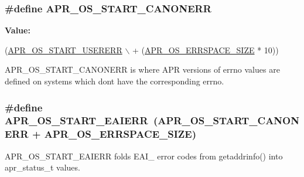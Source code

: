 \subsubsection[{\texorpdfstring{A\+P\+R\+\_\+\+O\+S\+\_\+\+S\+T\+A\+R\+T\+\_\+\+C\+A\+N\+O\+N\+E\+RR}{APR_OS_START_CANONERR}}]{\setlength{\rightskip}{0pt plus 5cm}\#define A\+P\+R\+\_\+\+O\+S\+\_\+\+S\+T\+A\+R\+T\+\_\+\+C\+A\+N\+O\+N\+E\+RR}\hypertarget{group__apr__errno_ga7bca957c11b80b31cb54b0d2cbe9e025}{}\label{group__apr__errno_ga7bca957c11b80b31cb54b0d2cbe9e025}
{\bfseries Value\+:}
\begin{DoxyCode}
(\hyperlink{group__apr__errno_gacd35b2de1e38a1fa4717e38d5e153571}{APR\_OS\_START\_USERERR} \(\backslash\)
                                 + (\hyperlink{group__apr__errno_gadb8d97e6836ccdc57b43b6119a5acccf}{APR\_OS\_ERRSPACE\_SIZE} * 10))
\end{DoxyCode}
A\+P\+R\+\_\+\+O\+S\+\_\+\+S\+T\+A\+R\+T\+\_\+\+C\+A\+N\+O\+N\+E\+RR is where A\+PR versions of errno values are defined on systems which don\textquotesingle{}t have the corresponding errno. 
\subsubsection[{\texorpdfstring{A\+P\+R\+\_\+\+O\+S\+\_\+\+S\+T\+A\+R\+T\+\_\+\+E\+A\+I\+E\+RR}{APR_OS_START_EAIERR}}]{\setlength{\rightskip}{0pt plus 5cm}\#define A\+P\+R\+\_\+\+O\+S\+\_\+\+S\+T\+A\+R\+T\+\_\+\+E\+A\+I\+E\+RR~({\bf A\+P\+R\+\_\+\+O\+S\+\_\+\+S\+T\+A\+R\+T\+\_\+\+C\+A\+N\+O\+N\+E\+RR} + {\bf A\+P\+R\+\_\+\+O\+S\+\_\+\+E\+R\+R\+S\+P\+A\+C\+E\+\_\+\+S\+I\+ZE})}\hypertarget{group__apr__errno_ga2d04991cb57c67a896e22125a1f22b49}{}\label{group__apr__errno_ga2d04991cb57c67a896e22125a1f22b49}
A\+P\+R\+\_\+\+O\+S\+\_\+\+S\+T\+A\+R\+T\+\_\+\+E\+A\+I\+E\+RR folds E\+A\+I\+\_\+ error codes from getaddrinfo() into apr\+\_\+status\+\_\+t values. 
